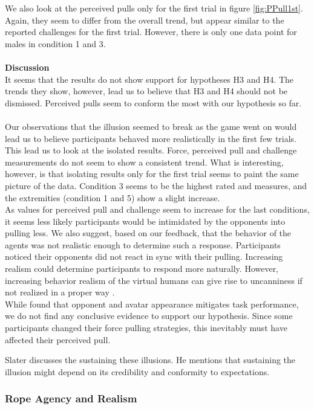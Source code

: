 We also look at the perceived pulls only for the first trial in figure \ref{fig:PPull1st}. Again, they seem to differ from the overall trend, but appear similar to the reported challenges for the first trial. However, there is only one data point for males in condition 1 and 3.
\\
\\
\textbf{Discussion}\\
It seems that the results do not show support for hypotheses H3 and H4. The trends they show, however, lead us to believe that H3 and H4 should not be dismissed. Perceived pulls seem to conform the most with our hypothesis so far.
\\
\\
Our observations that the illusion seemed to break as the game went on would lead us to believe participants behaved more realistically in the first few trials. This lead us to look at the isolated results. 
Force, perceived pull and challenge measurements do not seem to show a consistent trend. What is interesting, however, is that isolating results only for the first trial seems to paint the same picture of the data. Condition 3 seems to be the highest rated and measures, and the extremities (condition 1 and 5) show a slight increase.
\\
As values for perceived pull and challenge seem to increase for the last conditions, it seems less likely participants would be intimidated by the opponents into pulling less. We also suggest, based on our feedback, that the behavior of the agents was not realistic enough to determine such a response. Participants noticed their opponents did not react in sync with their pulling. Increasing realism could determine participants to respond more naturally.  However, increasing behavior realism of the  virtual humans can give rise to uncanniness if not realized in a proper way \cite{brenton2005uncanny,stein2019stay}. 
\\
While \cite{fox2015avatars,pena2016see} found that opponent and avatar appearance mitigates task performance, we do not find any conclusive evidence to support our hypothesis. Since some participants changed their force pulling strategies, this inevitably must have affected their perceived pull.

Slater discusses the sustaining these illusions. He mentions that sustaining the illusion might depend on its credibility and conformity to expectations. \cite{slater2009place}

\subsubsection{Rope Agency and Realism}
\label{subsubsection:ropeOwnRealism}

